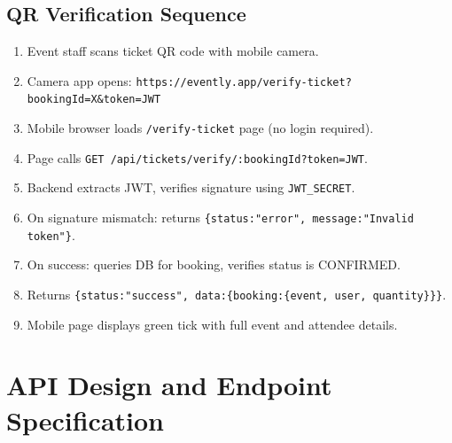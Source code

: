 \documentclass[12pt,a4paper]{report}
\begin{document}
\subsection{QR Verification Sequence}
\begin{enumerate}[leftmargin=2em]
    \item Event staff scans ticket QR code with mobile camera.
    \item Camera app opens: \texttt{https://evently.app/verify-ticket?bookingId=X\&token=JWT}
    \item Mobile browser loads \texttt{/verify-ticket} page (no login required).
    \item Page calls \texttt{GET /api/tickets/verify/:bookingId?token=JWT}.
    \item Backend extracts JWT, verifies signature using \texttt{JWT\_SECRET}.
    \item On signature mismatch: returns \texttt{\{status:"error", message:"Invalid token"\}}.
    \item On success: queries DB for booking, verifies status is CONFIRMED.
    \item Returns \texttt{\{status:"success", data:\{booking:\{event, user, quantity\}\}\}}.
    \item Mobile page displays green tick with full event and attendee details.
\end{enumerate}

\section{API Design and Endpoint Specification}
\end{document}
